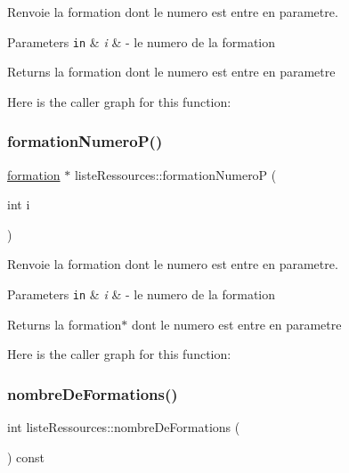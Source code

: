 Renvoie la formation dont le numero est entre en parametre. 


\begin{DoxyParams}[1]{Parameters}
\mbox{\tt in}  & {\em i} & -\/ le numero de la formation \\
\hline
\end{DoxyParams}
\begin{DoxyReturn}{Returns}
la formation dont le numero est entre en parametre 
\end{DoxyReturn}
Here is the caller graph for this function\+:
\hypertarget{classliste_ressources_a71ef69325d349c087c995f5aac9b9f27}{}\label{classliste_ressources_a71ef69325d349c087c995f5aac9b9f27} 
\subsubsection{\texorpdfstring{formation\+Numero\+P()}{formationNumeroP()}}
{\footnotesize\ttfamily \hyperlink{classformation}{formation} $\ast$ liste\+Ressources\+::formation\+NumeroP (\begin{DoxyParamCaption}\item[{int}]{i }\end{DoxyParamCaption})}



Renvoie la formation dont le numero est entre en parametre. 


\begin{DoxyParams}[1]{Parameters}
\mbox{\tt in}  & {\em i} & -\/ le numero de la formation \\
\hline
\end{DoxyParams}
\begin{DoxyReturn}{Returns}
la formation$\ast$ dont le numero est entre en parametre 
\end{DoxyReturn}
Here is the caller graph for this function\+:
\hypertarget{classliste_ressources_a332aca734617587a463197043a058b02}{}\label{classliste_ressources_a332aca734617587a463197043a058b02} 
\subsubsection{\texorpdfstring{nombre\+De\+Formations()}{nombreDeFormations()}}
{\footnotesize\ttfamily int liste\+Ressources\+::nombre\+De\+Formations (\begin{DoxyParamCaption}{ }\end{DoxyParamCaption}) const}



